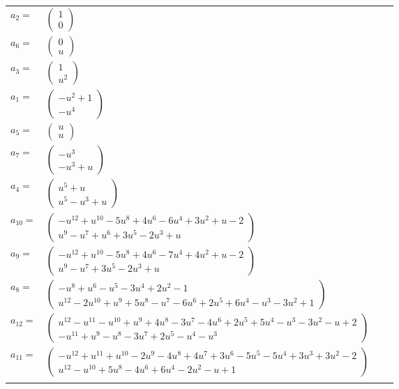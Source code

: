 \documentclass[1p]{elsarticle_modified}
\theoremstyle{definition}
\begin{document}
\begin{tabular}{m{7pt} m{180pt} m{7pt} m{180pt} }
\flushright $a_{2}=$&$\begin{pmatrix}1\\0\end{pmatrix}$ \\
\flushright $a_{6}=$&$\begin{pmatrix}0\\u\end{pmatrix}$ \\
\flushright $a_{3}=$&$\begin{pmatrix}1\\u^2\end{pmatrix}$ \\
\flushright $a_{1}=$&$\begin{pmatrix}- u^2+1\\- u^4\end{pmatrix}$ \\
\flushright $a_{5}=$&$\begin{pmatrix}u\\u\end{pmatrix}$ \\
\flushright $a_{7}=$&$\begin{pmatrix}- u^3\\- u^3+u\end{pmatrix}$ \\
\flushright $a_{4}=$&$\begin{pmatrix}u^5+u\\u^5- u^3+u\end{pmatrix}$ \\
\flushright $a_{10}=$&$\begin{pmatrix}- u^{12}+u^{10}-5 u^8+4 u^6-6 u^4+3 u^2+u-2\\u^9- u^7+u^6+3 u^5-2 u^3+u\end{pmatrix}$ \\
\flushright $a_{9}=$&$\begin{pmatrix}- u^{12}+u^{10}-5 u^8+4 u^6-7 u^4+4 u^2+u-2\\u^9- u^7+3 u^5-2 u^3+u\end{pmatrix}$ \\
\flushright $a_{8}=$&$\begin{pmatrix}- u^8+u^6- u^5-3 u^4+2 u^2-1\\u^{12}-2 u^{10}+u^9+5 u^8- u^7-6 u^6+2 u^5+6 u^4- u^3-3 u^2+1\end{pmatrix}$ \\
\flushright $a_{12}=$&$\begin{pmatrix}u^{12}- u^{11}- u^{10}+u^9+4 u^8-3 u^7-4 u^6+2 u^5+5 u^4- u^3-3 u^2- u+2\\- u^{11}+u^9- u^8-3 u^7+2 u^5- u^4- u^3\end{pmatrix}$ \\
\flushright $a_{11}=$&$\begin{pmatrix}- u^{12}+u^{11}+u^{10}-2 u^9-4 u^8+4 u^7+3 u^6-5 u^5-5 u^4+3 u^3+3 u^2-2\\u^{12}- u^{10}+5 u^8-4 u^6+6 u^4-2 u^2- u+1\end{pmatrix}$\\&\end{tabular}
\end{document}
